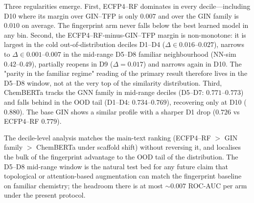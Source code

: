 \documentclass[11pt,a4paper]{article}
\begin{document}
Three regularities emerge. First, ECFP4--RF dominates in every decile---including D\num{10} where its margin over GIN--TFP is only $\num{+0.007}$ and over the GIN family is $\num{+0.010}$ on average. The fingerprint arm never falls below the best learned model in any bin. Second, the ECFP4--RF-minus-GIN--TFP margin is non-monotone: it is largest in the cold out-of-distribution deciles D\num{1}--D\num{4} ($\Delta \in \numrange{0.016}{0.027}$), narrows to $\Delta \in \numrange{0.001}{0.007}$ in the mid-range D\num{5}--D\num{8} familiar neighbourhood (NN-sim $\num{0.42}$--$\num{0.49}$), partially reopens in D\num{9} ($\Delta = \num{+0.017}$) and narrows again in D\num{10}. The "parity in the familiar regime" reading of the primary result therefore lives in the D\num{5}--D\num{8} window, not at the very top of the similarity distribution. Third, ChemBERTa tracks the GNN family in mid-range deciles (D\num{5}--D\num{7}: $\num{0.771}$--$\num{0.773}$) and falls behind in the OOD tail (D\num{1}--D\num{4}: $\num{0.734}$--$\num{0.769}$), recovering only at D\num{10} ($\num{0.880}$). The base GIN shows a similar profile with a sharper D\num{1} drop ($\num{0.726}$ vs ECFP4--RF $\num{0.779}$).

The decile-level analysis matches the main-text ranking (ECFP4--RF $>$ GIN family $>$ ChemBERTa under scaffold shift) without reversing it, and localises the bulk of the fingerprint advantage to the OOD tail of the distribution. The D\num{5}--D\num{8} mid-range window is the natural test bed for any future claim that topological or attention-based augmentation can match the fingerprint baseline on familiar chemistry; the headroom there is at most $\sim\num{0.007}$ ROC-AUC per arm under the present protocol.



\end{document}
